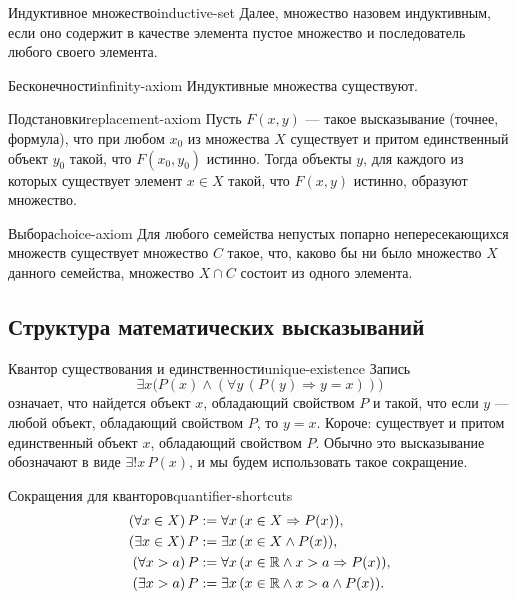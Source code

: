 \begin{definition}{Индуктивное множество}{inductive-set}
  Далее, множество назовем индуктивным, если оно содержит в качестве
  элемента пустое множество и последователь любого своего элемента.
\end{definition}

\begin{axiom}{Бесконечности}{infinity-axiom}
  Индуктивные множества существуют.
\end{axiom}

\begin{axiom}{Подстановки}{replacement-axiom}
  Пусть $F(x,y)$ — такое высказывание (точнее, формула), что при любом
  $x_0$ из множества $X$ существует и притом единственный объект $y_0$
  такой, что $F(x_0,y_0)$ истинно. Тогда объекты $y$, для каждого из которых
  существует элемент $x\in X$ такой, что $F(x,y)$ истинно, образуют
  множество.
\end{axiom}

\begin{axiom}{Выбора}{choice-axiom}
  Для любого семейства непустых попарно непересекающихся множеств
  существует множество $C$ такое, что, каково бы ни было множество $X$
  данного семейства, множество $X\cap C$ состоит из одного элемента.
\end{axiom}

\subsection{Структура математических высказываний}

\begin{definition}{Квантор существования и единственности}{unique-existence}
  Запись
  \[
    \exists x\bigl(P(x)\land(\forall y\,(P(y)\Rightarrow y=x))\bigr)
  \]
  означает, что найдется объект $x$, обладающий свойством $P$ и такой, что
  если $y$ — любой объект, обладающий свойством $P$, то $y=x$. Короче:
  существует и притом единственный объект $x$, обладающий свойством $P$.
  Обычно это высказывание обозначают в виде $\exists!x\,P(x)$, и мы будем
  использовать такое сокращение.
\end{definition}

\begin{properties}{Сокращения для кванторов}{quantifier-shortcuts}
  \begin{align*}
    (\forall x\in X)\,P&:=\forall x\,(x\in X\Rightarrow P(x)),\\
    (\exists x\in X)\,P&:=\exists x\,(x\in X\land P(x)),\\
    (\forall x>a)\,P&:=\forall x\,(x\in\mathbb{R}\land x>a\Rightarrow P(x)),\\
    (\exists x>a)\,P&:=\exists x\,(x\in\mathbb{R}\land x>a\land P(x)).
  \end{align*}
\end{properties}


